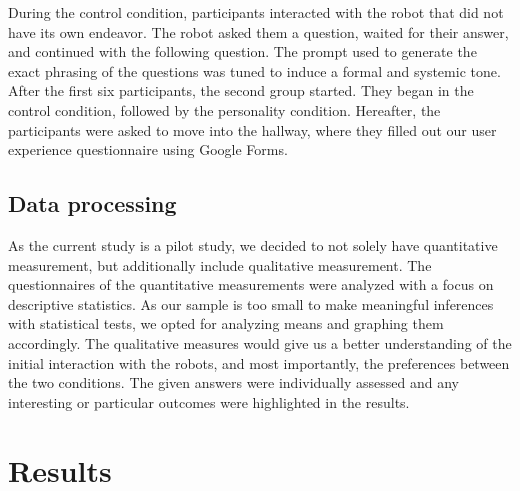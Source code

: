 \documentclass[runningheads]{llncs}
\begin{document}
During the control condition, participants interacted with the robot that did not have its own endeavor. The robot asked them a question, waited for their answer, and continued with the following question. The prompt used to generate the exact phrasing of the questions was tuned to induce a formal and systemic tone.\\

After the first six participants, the second group started. They began in the control condition, followed by the personality condition. Hereafter, the participants were asked to move into the hallway, where they filled out our user experience questionnaire using Google Forms. 

\subsection{Data processing}
As the current study is a pilot study, we decided to not solely have quantitative measurement, but additionally include qualitative measurement. The questionnaires of the quantitative measurements were analyzed with a focus on descriptive statistics. As our sample is too small to make meaningful inferences with statistical tests, we opted for analyzing means and graphing them accordingly. The qualitative measures would give us a better understanding of the initial interaction with the robots, and most importantly, the preferences between the two conditions. The given answers were individually assessed and any interesting or particular outcomes were highlighted in the results. 

\section{Results}
\end{document}
